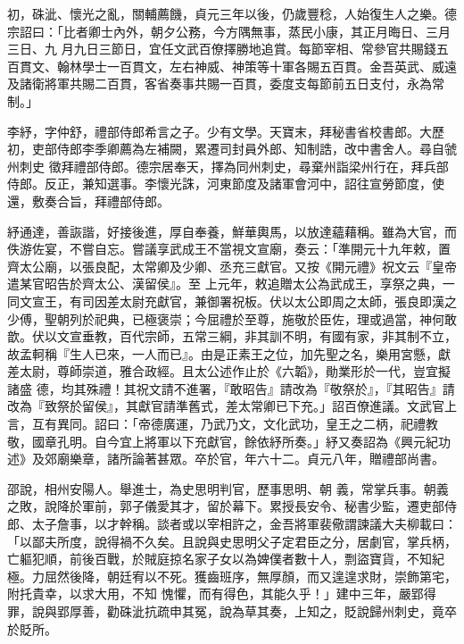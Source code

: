 \begin{pinyinscope}
 初，硃泚、懷光之亂，關輔薦饑，貞元三年以後，仍歲豐稔，人始復生人之樂。德宗詔曰：「比者卿士內外，朝夕公務，今方隅無事，蒸民小康，其正月晦日、三月三日、九
 月九日三節日，宜任文武百僚擇勝地追賞。每節宰相、常參官共賜錢五百貫文、翰林學士一百貫文，左右神威、神策等十軍各賜五百貫。金吾英武、威遠及諸衛將軍共賜二百貫，客省奏事共賜一百貫，委度支每節前五日支付，永為常制。」



 李紓，字仲舒，禮部侍郎希言之子。少有文學。天寶末，拜秘書省校書郎。大歷初，吏部侍郎李季卿薦為左補闕，累遷司封員外郎、知制誥，改中書舍人。尋自虢州刺史
 徵拜禮部侍郎。德宗居奉天，擇為同州刺史，尋棄州詣梁州行在，拜兵部侍郎。反正，兼知選事。李懷光誅，河東節度及諸軍會河中，詔往宣勞節度，使還，敷奏合旨，拜禮部侍郎。



 紓通達，善詼諧，好接後進，厚自奉養，鮮華輿馬，以放達蘊藉稱。雖為大官，而佚游佐宴，不嘗自忘。嘗議享武成王不當視文宣廟，奏云：「準開元十九年敕，置齊太公廟，以張良配，太常卿及少卿、丞充三獻官。又按《開元禮》祝文云『皇帝遣某官昭告於齊太公、漢留侯』。至
 上元年，敕追贈太公為武成王，享祭之典，一同文宣王，有司因差太尉充獻官，兼御署祝板。伏以太公即周之太師，張良即漢之少傅，聖朝列於祀典，已極褒崇；今屈禮於至尊，施敬於臣佐，理或過當，神何敢歆。伏以文宣垂教，百代宗師，五常三綱，非其訓不明，有國有家，非其制不立，故孟軻稱『生人已來，一人而已』。由是正素王之位，加先聖之名，樂用宮懸，獻差太尉，尊師崇道，雅合政經。且太公述作止於《六韜》，勛業形於一代，豈宜擬諸盛
 德，均其殊禮！其祝文請不進署，『敢昭告』請改為『敬祭於』，『其昭告』請改為『致祭於留侯』，其獻官請準舊式，差太常卿已下充。」詔百僚進議。文武官上言，互有異同。詔曰：「帝德廣運，乃武乃文，文化武功，皇王之二柄，祀禮教敬，國章孔明。自今宜上將軍以下充獻官，餘依紓所奏。」紓又奏詔為《興元紀功述》及郊廟樂章，諸所論著甚眾。卒於官，年六十二。貞元八年，贈禮部尚書。



 邵說，相州安陽人。舉進士，為史思明判官，歷事思明、朝
 義，常掌兵事。朝義之敗，說降於軍前，郭子儀愛其才，留於幕下。累授長安令、秘書少監，遷吏部侍郎、太子詹事，以才幹稱。談者或以宰相許之，金吾將軍裴儆謂諫議大夫柳載曰：「以鄙夫所度，說得禍不久矣。且說與史思明父子定君臣之分，居劇官，掌兵柄，亡軀犯順，前後百戰，於賊庭掠名家子女以為婢僕者數十人，剽盜寶貨，不知紀極。力屈然後降，朝廷宥以不死。獲齒班序，無厚顏，而又遑遑求財，崇飾第宅，附托貴幸，以求大用，不知
 愧懼，而有得色，其能久乎！」建中三年，嚴郢得罪，說與郢厚善，勸硃泚抗疏申其冤，說為草其奏，上知之，貶說歸州刺史，竟卒於貶所。




\end{pinyinscope}
